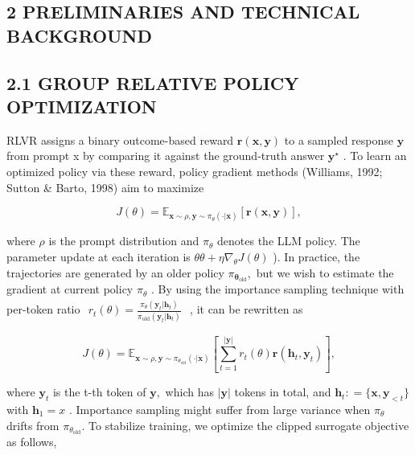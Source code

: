 \documentclass[
  10
]{article}
\begin{document}
\subsection{2 PRELIMINARIES AND TECHNICAL
BACKGROUND}\label{preliminaries-and-technical-background}

\subsection{2.1 GROUP RELATIVE POLICY
OPTIMIZATION}\label{group-relative-policy-optimization}

RLVR assigns a binary outcome-based reward
\(\mathbf { r } ( \mathbf { x } , \mathbf { y } )\) to a sampled
response \(\mathbf { y }\) from prompt x by comparing it against the
ground-truth answer \(\mathbf { y } ^ { \star }\) . To learn an
optimized policy via these reward, policy gradient methods (Williams,
1992; Sutton \& Barto, 1998) aim to maximize

\[
J (\theta) = \mathbb {E} _ {\mathbf {x} \sim \rho , \mathbf {y} \sim \pi_ {\theta} (\cdot | \mathbf {x})} [ \mathbf {r} (\mathbf {x}, \mathbf {y}) ],
\]

where \(\rho\) is the prompt distribution and \(\pi _ { \theta }\)
denotes the LLM policy. The parameter update at each iteration is
\(\theta  \theta + \eta \nabla _ { \theta } J ( \theta )\) ). In
practice, the trajectories are generated by an older policy
\(\pi _ { \boldsymbol { \theta } _ { \mathrm { o l d } } } ,\) but we
wish to estimate the gradient at current policy \(\pi _ { \theta }\) .
By using the importance sampling technique with per-token ratio
\(\begin{array} { r } { r _ { t } ( \theta ) = \frac { \pi _ { \theta } \left( \mathbf { y } _ { t } | \mathbf { h } _ { t } \right) } { \pi _ { \mathrm { o l d } } \left( \mathbf { y } _ { t } | \mathbf { h } _ { t } \right) } } \end{array}\)
, it can be rewritten as

\[
J (\theta) = \mathbb {E} _ {\mathbf {x} \sim \rho , \mathbf {y} \sim \pi_ {\theta_ {\mathrm{old}}} (\cdot | \mathbf {x})} \left[ \sum_ {t = 1} ^ {| \mathbf {y} |} r _ {t} (\theta) \mathbf {r} (\mathbf {h} _ {t}, \mathbf {y} _ {t}) \right],
\]

where \(\mathbf { y } _ { t }\) is the t-th token of \(\mathbf { y } ,\)
which has \(| \mathbf { y } |\) tokens in total, and
\(\mathbf { h } _ { t } : = \{ \mathbf { x } , \mathbf { y } _ { < t } \}\)
with \(\mathbf { h } _ { 1 } = x\) . Importance sampling might suffer
from large variance when \(\pi _ { \theta }\) drifts from
\(\pi _ { \theta _ { \mathrm { o l d } } } .\) To stabilize training, we
optimize the clipped surrogate objective as follows,
\end{document}
